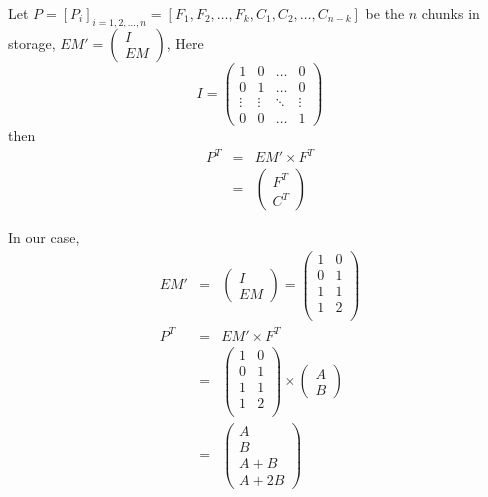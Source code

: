 \documentclass[slidestop,compress,mathserif]{beamer}
\begin{document}
\begin{frame}[options]
{

Let $P = [P_{i}]_{i=1,2,\dots,n} = [F_{1}, F_{2}, \dots, F_{k}, C_{1}, C_{2}, \dots, C_{n-k}]$ be the $n$ chunks in storage, 
$EM' = \begin{pmatrix} I \\ EM \end{pmatrix}$,
Here 
$$
I = \begin{pmatrix} 
  1 & 0 & \ldots & 0 \\ 
  0 & 1 & \ldots & 0 \\
  \vdots & \vdots & \ddots & \vdots \\
  0 & 0 & \ldots & 1 
\end{pmatrix}
$$
then
\begin{displaymath}
\begin{array}{rcl}
P^{T} &=& EM' \times F^{T} \\
&=& \begin{pmatrix} F^{T} \\ C^{T} \end{pmatrix}
\end{array}
\end{displaymath}
}

{
In our case,
\begin{displaymath}
\begin{array}{rcl}
EM' &=& \begin{pmatrix} I \\ EM \end{pmatrix} 
  = \begin{pmatrix}
	1 & 0 \\
	0 & 1 \\
	1 & 1 \\
	1 & 2 \\
	\end{pmatrix} \\	
P^{T} &=& EM' \times F^{T} \\
&=& \begin{pmatrix}
	1 & 0 \\
	0 & 1 \\
	1 & 1 \\
	1 & 2 \\
	\end{pmatrix}
	\times
	\begin{pmatrix} A \\ B \end{pmatrix} \\
	&=& \begin{pmatrix}
	A \\
	B \\
	A+B \\
	A+2B
	\end{pmatrix}
\end{array}
\end{displaymath}

}
\end{frame}
\end{document}
